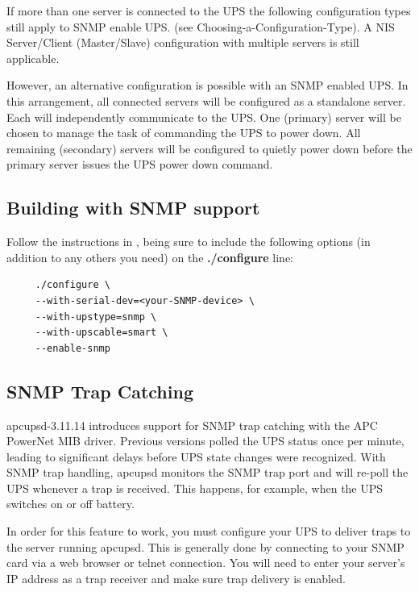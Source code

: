{{{{{{{If more than one server is connected to the UPS the following configuration
types still apply to SNMP enable UPS. (see 
{Choosing-a-Configuration-Type}).  A NIS Server/Client (Master/Slave) configuration
with multiple servers is still applicable.
 
However, an alternative configuration is possible with an SNMP enabled UPS.  In
this arrangement, all connected servers will be configured as a standalone server.
Each will independently communicate to the UPS.  One (primary) server will be 
chosen to manage the task of commanding the UPS to power down. All remaining
(secondary) servers will be configured to quietly power down before the
primary server issues the UPS power down command. 

\subsection*{Building with SNMP support}

Follow the instructions in 
,
being sure to include the following options (in addition to any others you need) on the
{\bf ./configure} line: 

\footnotesize
\begin{verbatim}
     ./configure \
     --with-serial-dev=<your-SNMP-device> \
     --with-upstype=snmp \
     --with-upscable=smart \
     --enable-snmp
\end{verbatim}
\normalsize

\label{SNMP-Trap-Catching}
\subsection*{SNMP Trap Catching}

apcupsd-3.11.14 introduces support for SNMP trap catching with the APC
PowerNet MIB driver. Previous versions polled the UPS status once per minute, 
leading to significant delays before UPS state changes were recognized. With 
SNMP trap handling, apcupsd monitors the SNMP trap port and will re-poll the
UPS whenever a trap is received. This happens, for example, when the UPS 
switches on or off battery.

In order for this feature to work, you must configure your UPS to
deliver traps to the server running apcupsd. This is generally done by 
connecting to your SNMP card via a web browser or telnet connection. You
will need to enter your server's IP address as a trap receiver and make sure
trap delivery is enabled.

}}}}}}}
